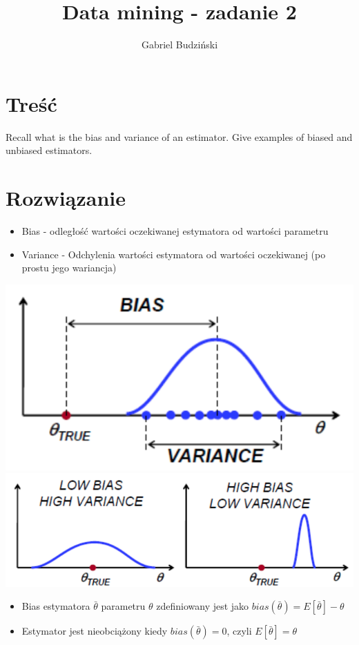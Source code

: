\documentclass{article}
\title{Data mining {-} zadanie 2}
\author{Gabriel Budziński}
\begin{document}
\maketitle

\section{Treść}
Recall what is the bias and variance of an estimator. Give examples of biased and unbiased
estimators.

\section{Rozwiązanie}

\begin{itemize}
    \item Bias {-} odległość wartości oczekiwanej estymatora od wartości parametru
    \item Variance {-} Odchylenia wartości estymatora od wartości oczekiwanej (po prostu jego wariancja)
\end{itemize}

\includegraphics[scale=0.5]{b&v.png}
\includegraphics[scale=0.5]{b&v_tradeoff.png}
\\
\begin{itemize}
    \item Bias estymatora $\bar{\theta}$ parametru $\theta$ zdefiniowany jest jako $bias(\bar{\theta}) = E[\bar{\theta}] - \theta$
    \item Estymator jest nieobciążony kiedy $bias(\bar{\theta}) = 0$, czyli $E[\bar{\theta}] = \theta$
\end{itemize}
\end{document}

